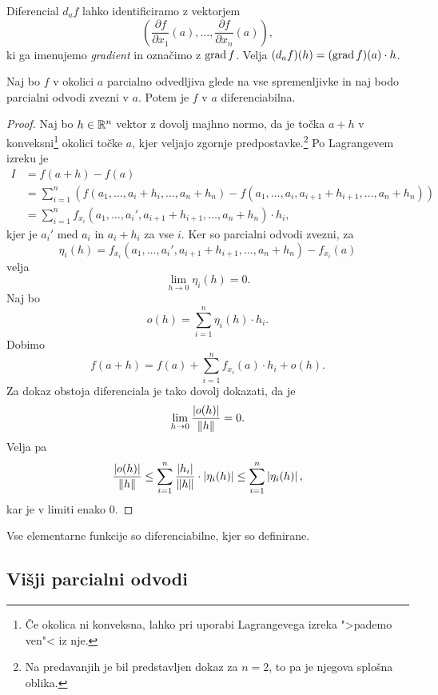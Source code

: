\begin{opomba}
Diferencial $d_af$ lahko identificiramo z vektorjem
\[
\left(
	\frac{\partial f}{\partial x_1}(a),
	\dots,
	\frac{\partial f}{\partial x_n}(a)
\right),
\]
ki ga imenujemo \emph{gradient} in
označimo z $\operatorname{grad} f$. Velja $(d_af)(h) = (\operatorname{grad} f)(a) \cdot h$.
\end{opomba}

\begin{izrek}
Naj bo $f$ v okolici $a$ parcialno odvedljiva glede na vse
spremenljivke in naj bodo parcialni odvodi zvezni v $a$. Potem je
$f$ v $a$ diferenciabilna.
\end{izrek}

\begin{proof}
Naj bo $h \in \mathbb{R}^n$ vektor z dovolj majhno normo, da je točka $a+h$
v konveksni\footnote{Če okolica ni konveksna, lahko pri uporabi
Lagrangevega izreka ">pademo ven"< iz nje.} okolici točke $a$, kjer
veljajo zgornje predpostavke.\footnote{Na predavanjih je bil
predstavljen dokaz za $n=2$, to pa je njegova splošna oblika.} Po
Lagrangevem izreku je
\begin{align*}
I &= f(a+h) - f(a)
\\
&= \sum_{i=1}^n \left(
	f(a_1, \dots, a_i + h_i, \dots, a_n + h_n) - 
	f(a_1, \dots, a_i, a_{i+1} + h_{i+1}, \dots, a_n + h_n)
\right)
\\
&=\sum_{i=1}^n f_{x_i}(
	a_1, \dots, a_i', a_{i+1} + h_{i+1}, \dots, a_n + h_n
) \cdot h_i,
\end{align*}
kjer je $a_i'$ med $a_i$ in $a_i + h_i$ za vse $i$. Ker so
parcialni odvodi zvezni, za
\[
\eta_i(h) =
f_{x_i}(a_1, \dots, a_i', a_{i+1} + h_{i+1}, \dots, a_n + h_n)
- f_{x_i}(a)
\]
velja
\[
\lim_{h \to 0}\eta_i(h) = 0.
\]
Naj bo
\[
o(h) = \sum_{i=1}^n \eta_i(h) \cdot h_i.
\]
Dobimo
\[
f(a+h) = f(a) + \sum_{i=1}^n f_{x_i}(a) \cdot h_i + o(h).
\]
Za dokaz obstoja diferenciala je tako dovolj dokazati, da je
\[
\lim_{h \to 0}\frac{\left\lvert o(h)\right\rvert}{\left\lVert h\right\rVert} = 0.
\]
Velja pa
\[
\frac{\left\lvert o(h)\right\rvert}{\left\lVert h\right\rVert} \leq
\sum_{i=1}^n \frac{\left\lvert h_i\right\rvert}{\left\lVert h\right\rVert} \cdot \left\lvert \eta_i(h)\right\rvert \leq
\sum_{i=1}^n \left\lvert \eta_i(h)\right\rvert,
\]
kar je v limiti enako $0$.
\end{proof}

\begin{posledica}
Vse elementarne funkcije so diferenciabilne, kjer so definirane.
\end{posledica}

\newpage

\subsection{Višji parcialni odvodi}

